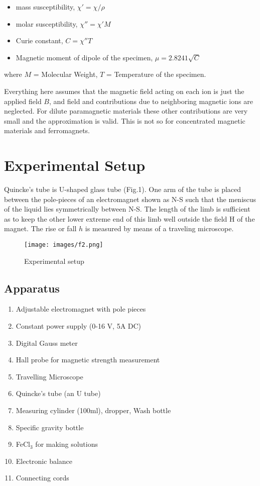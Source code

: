 \begin{itemize}
    \item mass susceptibility, $\chi' = \chi/\rho$
    \item molar susceptibility, $\chi'' = \chi'M$
    \item Curie constant, $C = \chi''T$
    \item Magnetic moment of dipole of the specimen, $\mu=2.8241\sqrt{C}$
\end{itemize}

where $M$ = Molecular Weight, $T$ = Temperature of the specimen.


Everything here assumes that the magnetic field acting on each ion is just the applied field $B$, and field and contributions due to neighboring magnetic ions are neglected. For dilute paramagnetic materials these other contributions are very small and the approximation is valid. This is not so for concentrated magnetic materials and ferromagnets. 



\section{Experimental Setup}
Quincke’s tube is U-shaped glass tube (Fig.1).  One arm of the tube is placed
between the pole-pieces of an electromagnet shown as N-S such that the meniscus of the liquid lies symmetrically between N-S. The length of the limb is sufficient as to keep the other lower extreme end of this limb well outside the field H of the magnet. The rise or fall $h$ is measured by means of a traveling microscope.

\begin{figure}[H]
    \centering
    \texttt{[image: images/f2.png]}
    \caption{Experimental setup}
    \label{fig:enter-label}
\end{figure}

\subsection{Apparatus}
\begin{enumerate}
    \item Adjustable electromagnet with pole pieces
    \item Constant power supply (0-16 V, 5A DC)
    \item Digital Gauss meter
    \item Hall probe for magnetic strength measurement
    \item Travelling Microscope
    \item Quincke’s tube (an U tube)
    \item Measuring cylinder (100ml), dropper, Wash bottle
    \item Specific gravity bottle
    \item FeCl$_3$ for making solutions
    \item Electronic balance
    \item Connecting cords 

\end{enumerate}